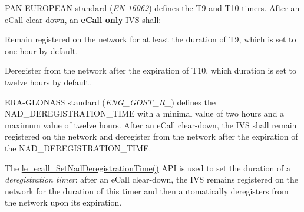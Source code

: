 \begin{DoxyEnumerate}
\item P\+A\+N-\/\+E\+U\+R\+O\+P\+E\+AN standard ({\itshape EN 16062}) defines the T9 and T10 timers. After an e\+Call clear-\/down, an {\bfseries e\+Call only} I\+VS shall\+:
\begin{DoxyItemize}
\item Remain registered on the network for at least the duration of T9, which is set to one hour by default.
\item Deregister from the network after the expiration of T10, which duration is set to twelve hours by default.
\end{DoxyItemize}
\item E\+R\+A-\/\+G\+L\+O\+N\+A\+SS standard ({\itshape E\+N\+G\+\_\+\+G\+O\+S\+T\+\_\+\+R\+\_}) defines the N\+A\+D\+\_\+\+D\+E\+R\+E\+G\+I\+S\+T\+R\+A\+T\+I\+O\+N\+\_\+\+T\+I\+ME with a minimal value of two hours and a maximum value of twelve hours. After an e\+Call clear-\/down, the I\+VS shall remain registered on the network and deregister from the network after the expiration of the N\+A\+D\+\_\+\+D\+E\+R\+E\+G\+I\+S\+T\+R\+A\+T\+I\+O\+N\+\_\+\+T\+I\+ME.
\end{DoxyEnumerate}

The \hyperlink{le__ecall__interface_8h_a66e454e84db7d337d76bc867b57891a1}{le\+\_\+ecall\+\_\+\+Set\+Nad\+Deregistration\+Time()} A\+PI is used to set the duration of a {\itshape deregistration timer}\+: after an e\+Call clear-\/down, the I\+VS remains registered on the network for the duration of this timer and then automatically deregisters from the network upon its expiration.


